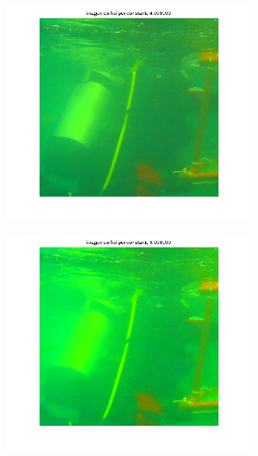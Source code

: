 \documentclass{article}
\begin{document}
\begin{figure}[H]
\begin{subfigure}{0.5\textwidth}
	\centering
        \includegraphics[width=0.9\textwidth]{1908xx-sat-por-4.png}
    \end{subfigure}\hfill
	\begin{subfigure}{0.5\textwidth}
	\centering
        \includegraphics[width=0.9\textwidth]{1908xx-sat-por-6.png}
    \end{subfigure}\hfill
\end{figure}\hfill

\subsection{}
\end{document}
